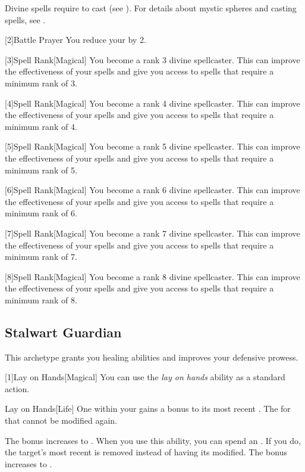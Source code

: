         Divine spells require  to cast (see ).
        For details about mystic spheres and casting spells, see .

        [2]{Battle Prayer} You reduce your  by 2.

        [3]{Spell Rank}[Magical] You become a rank 3 divine spellcaster.
        This can improve the effectiveness of your spells and give you access to spells that require a minimum rank of 3.

        [4]{Spell Rank}[Magical] You become a rank 4 divine spellcaster.
        This can improve the effectiveness of your spells and give you access to spells that require a minimum rank of 4.

        [5]{Spell Rank}[Magical] You become a rank 5 divine spellcaster.
        This can improve the effectiveness of your spells and give you access to spells that require a minimum rank of 5.

        [6]{Spell Rank}[Magical] You become a rank 6 divine spellcaster.
        This can improve the effectiveness of your spells and give you access to spells that require a minimum rank of 6.

        [7]{Spell Rank}[Magical] You become a rank 7 divine spellcaster.
        This can improve the effectiveness of your spells and give you access to spells that require a minimum rank of 7.

        [8]{Spell Rank}[Magical] You become a rank 8 divine spellcaster.
        This can improve the effectiveness of your spells and give you access to spells that require a minimum rank of 8.

    \subsection{Stalwart Guardian}
        This archetype grants you healing abilities and improves your defensive prowess.

        [1]{Lay on Hands}[Magical] You can use the \textit{lay on hands} ability as a standard action.
        \begin{freeability}{Lay on Hands}[Life]
            One  within your  gains a  bonus to its most recent .
            The  for that  cannot be modified again.

            \rankline
             The bonus increases to .
             When you use this ability, you can spend an .
            If you do, the target's most recent  is removed instead of having its  modified.
             The bonus increases to .
        \end{freeability}

